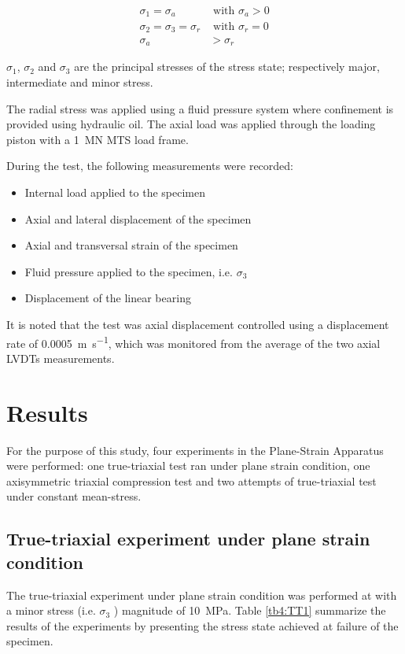 \begin{align}
    \sigma_1 = \sigma_a &\text{ with } \sigma_a > 0 \\
    \sigma_2 = \sigma_3 = \sigma_r  &\text{ with } \sigma_r = 0 \\
    \sigma_a &> \sigma_r
\end{align}

$\sigma_1$, $\sigma_2$  and  $\sigma_3$  are the principal stresses of the stress state; respectively major, intermediate and minor stress.

The radial stress was applied using a fluid pressure system where confinement is provided using hydraulic oil. The axial load was applied through the loading piston with a \SI{1}{MN} MTS load frame. 

During the test, the following measurements were recorded: 

\begin{itemize}
    \item Internal load applied to the specimen 
    \item Axial and lateral displacement of the specimen 
    \item Axial and transversal strain of the specimen
    \item Fluid pressure applied to the specimen, i.e. $\sigma_3$
    \item Displacement of the linear bearing
\end{itemize}

It is noted that the test was axial displacement controlled using a displacement rate of \SI{0.0005}{\meter\per\second}, which was monitored from the average of the two axial LVDTs measurements. 

\section{Results}

For the purpose of this study, four experiments in the Plane-Strain Apparatus were performed: one true-triaxial test ran under plane strain condition, one axisymmetric triaxial compression test and two attempts of true-triaxial test under constant mean-stress. 

\subsection{True-triaxial experiment under plane strain condition}

The true-triaxial experiment under plane strain condition was performed at with a minor stress (i.e. $\sigma_3$ ) magnitude of \SI{10}{MPa}. Table \ref{tb4:TT1} summarize the results of the experiments by presenting the stress state achieved at failure of the specimen.

